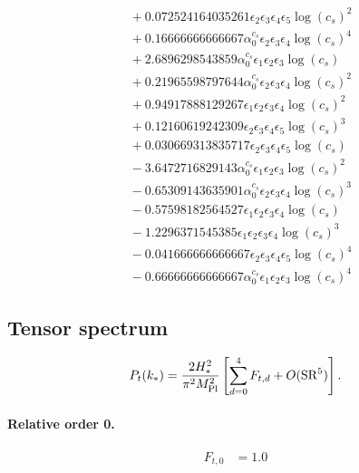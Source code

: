 \documentclass[10pt]{article}
\begin{document}
\begin{align*}
&{}  + 0.072524164035261 \epsilon_{2} \epsilon_{3} \epsilon_{4} \epsilon_{5} \log{\left(c_{s} \right)}^{2} \\
&{}  + 0.16666666666667 \alpha_{0}^{c_s} \epsilon_{2} \epsilon_{3} \epsilon_{4} \log{\left(c_{s} \right)}^{4} \\
&{}  + 2.6896298543859 \alpha_{0}^{c_s} \epsilon_{1} \epsilon_{2} \epsilon_{3} \log{\left(c_{s} \right)} \\
&{}  + 0.21965598797644 \alpha_{0}^{c_s} \epsilon_{2} \epsilon_{3} \epsilon_{4} \log{\left(c_{s} \right)}^{2} \\
&{}  + 0.94917888129267 \epsilon_{1} \epsilon_{2} \epsilon_{3} \epsilon_{4} \log{\left(c_{s} \right)}^{2} \\
&{}  + 0.12160619242309 \epsilon_{2} \epsilon_{3} \epsilon_{4} \epsilon_{5} \log{\left(c_{s} \right)}^{3} \\
&{}  + 0.030669313835717 \epsilon_{2} \epsilon_{3} \epsilon_{4} \epsilon_{5} \log{\left(c_{s} \right)} \\
&{}  - 3.6472716829143 \alpha_{0}^{c_s} \epsilon_{1} \epsilon_{2} \epsilon_{3} \log{\left(c_{s} \right)}^{2} \\
&{}  - 0.65309143635901 \alpha_{0}^{c_s} \epsilon_{2} \epsilon_{3} \epsilon_{4} \log{\left(c_{s} \right)}^{3} \\
&{}  - 0.57598182564527 \epsilon_{1} \epsilon_{2} \epsilon_{3} \epsilon_{4} \log{\left(c_{s} \right)} \\
&{}  - 1.2296371545385 \epsilon_{1} \epsilon_{2} \epsilon_{3} \epsilon_{4} \log{\left(c_{s} \right)}^{3} \\
&{}  - 0.041666666666667 \epsilon_{2} \epsilon_{3} \epsilon_{4} \epsilon_{5} \log{\left(c_{s} \right)}^{4} \\
&{}  - 0.66666666666667 \alpha_{0}^{c_s} \epsilon_{1} \epsilon_{2} \epsilon_{3} \log{\left(c_{s} \right)}^{4}
\end{align*}

\subsection{Tensor spectrum}
\[P_t(k_*)=\frac{2H_*^2}{\pi^2M_{\rm Pl}^2}\left[\sum_{d=0}^{4}F_{t,d}+O(\mathrm{SR}^{5})\right].\]
\paragraph{Relative order 0.}
\begin{align*}
F_{t,0} &= 1.0
\end{align*}
\end{document}
